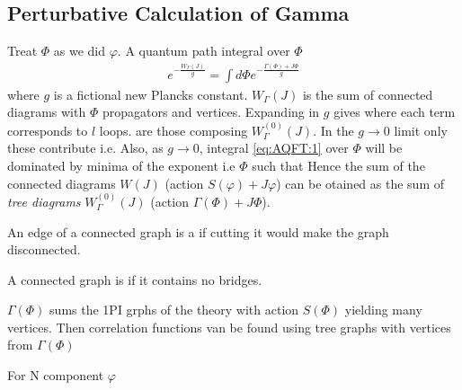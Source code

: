 \documentclass{article}
\begin{document}
\subsection{Perturbative Calculation of Gamma}
Treat $\Phi$ as we did $\varphi$. A quantum path integral over $\Phi$
\begin{align} \label{eq:AQFT:1}
e^{-\frac{W_\Gamma(J)}{g}} = \int d\Phi e^{-\frac{\Gamma(\Phi)+J\Phi}{g}}
\end{align}
where $g$ is a fictional new Plancks constant. $W_\Gamma(J)$ is the sum of connected diagrams with $\Phi$ propagators and vertices. Expanding in $g$ gives 
where each term corresponds to $l$ loops.  are those composing $W^{(0)}_\Gamma(J)$. In the $g\to 0$ limit only these contribute i.e. 
Also, as $g\to 0 $, integral \ref{eq:AQFT:1} over $\Phi$ will be dominated by minima of the exponent i.e $\Phi$ such that 
Hence the sum of the connected diagrams $W(J)$ (action $S(\varphi)+J\varphi$) can be otained as the sum of \emph{tree diagrams} $W_\Gamma^{(0)}(J)$ (action $\Gamma(\Phi)+J\Phi$). 

\begin{definition}[Bridge]
An edge of a connected graph is a  if cutting it would make the graph disconnected. 
\end{definition}

\begin{definition}
A connected graph is  if it contains no bridges. 
\end{definition}

$\Gamma(\Phi)$ sums the 1PI grphs of the theory with action $S(\Phi)$ yielding many vertices. Then correlation functions van be found using tree graphs with vertices from $\Gamma(\Phi)$

\begin{example}
For N component $\varphi$ 
\end{example}
\end{document}
